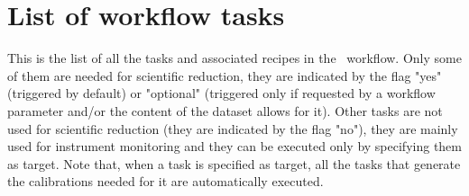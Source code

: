 \section{List of workflow tasks}

This is the list of all the tasks and associated recipes in the
\instname\ workflow.  Only some of them are needed for scientific
reduction, they are indicated by the flag "yes" (triggered by default)
or "optional" (triggered only if requested by a workflow
parameter and/or the content of the dataset allows for it). Other tasks are not used for scientific reduction (they
are indicated by the flag "no"), they are mainly used for instrument
monitoring and they can be executed only by specifying them as
target. Note that, when a task is specified as target, all the tasks
that generate the calibrations needed for it are automatically
executed.

